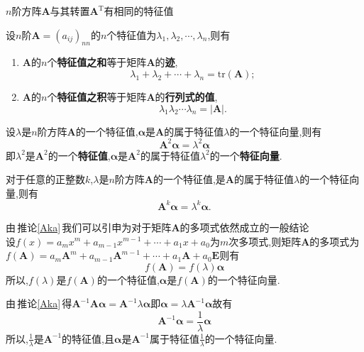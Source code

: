 \documentclass[9pt,a4paper]{book}
\begin{document}
\begin{feature}
	$ n $阶方阵$ \bm{A} $与其转置$ \bm{A}^{\mathrm{T}} $有相同的特征值
\end{feature}
\begin{feature}
	设$ n $阶$ \bm{A}=(a_{ij})_{nn} $的$ n $个特征值为$ \lambda_1,\lambda_2,\cdots,\lambda_n $,则有
	\begin{enumerate}
		\item $ \bm{A}$的$ n $个\textbf{特征值之和}等于矩阵$ \bm{A}$的\textbf{迹},\[\lambda_1+\lambda_2+\cdots+\lambda_n=\mathrm{tr}(\bm{A}) ;\]
		\item $ \bm{A}$的$ n $个\textbf{特征值之积}等于矩阵$ \bm{A}$的\textbf{行列式的值},\[\lambda_1\lambda_2\cdots\lambda_n=|\bm{A}| .\]
	\end{enumerate}
\end{feature}
\begin{theorem}
	设$ \lambda$是$ n $阶方阵$ \bm{A} $的一个特征值,$ \bm{\alpha} $是$ \bm{A}$的属于特征值$ \lambda$的一个特征向量,则有
	\[\bm{A}^2\bm{\alpha}=\lambda^2\bm{\alpha}\]
	即$ \lambda^2 $是$\bm{A}^2 $的一个\textbf{特征值},$ \bm{\alpha} $是$ \bm{A}^2 $的属于特征值$ \lambda^2 $的一个\textbf{特征向量}.
\end{theorem}
\begin{inference}\label{Aka}
	对于任意的正整数$ k $,$ \lambda$是$ n $阶方阵$ \bm{A} $的一个特征值,$  $是$ \bm{A}$的属于特征值$ \lambda$的一个特征向量,则有
	\[\bm{A}^k\bm{\alpha}=\lambda^k\bm{\alpha}.\]
\end{inference}
\begin{inference}
	由\,推论\ref{Aka}\,我们可以引申为对于矩阵$ \bm{A} $的多项式依然成立的一般结论\\
	设$ f(x)=a_mx^m+a_{m-1}x^{m-1}+\cdots+a_1x+a_0 $为$ m $次多项式,则矩阵$ \bm{A} $的多项式为$f(\bm{A}) =a_m\bm{A}^m+a_{m-1}\bm{A}^{m-1}+\cdots+a_1\bm{A}+a_0\bm{E} $则有\[f(\bm{A})=f(\lambda)\bm{\alpha}\]
	所以,$ f(\lambda) $是$ f(\bm{A}) $的一个特征值,$ \bm{\alpha} $是$ f(\bm{A}) $的一个特征向量.
\end{inference}
\begin{inference}
	由\,推论\ref{Aka}\,得$\bm{A}^{-1} \bm{A}\bm{\alpha}=\bm{A}^{-1}\lambda\bm{\alpha} $即$ \bm{\alpha}=\lambda\bm{A}^{-1}\bm{\alpha} $故有
	\[
	\bm{A}^{-1}\bm{\alpha}=\frac{1}{\lambda}\bm{\alpha}
	\]
	所以,$\displaystyle \frac{1}{\lambda} $是$ \bm{A}^{-1} $的特征值,且$\bm{\alpha} $是$ \bm{A}^{-1} $属于特征值$\displaystyle \frac{1}{\lambda} $的一个特征向量.
\end{inference}
\end{document}
